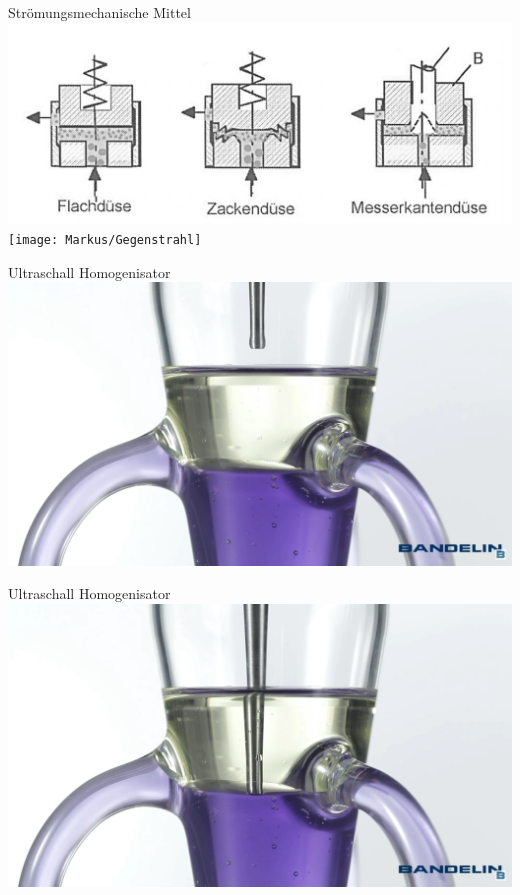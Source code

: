 \documentclass{beamer} %
\begin{document}
\begin{frame}{Strömungsmechanische Mittel}
	\centering
	\includegraphics[width=0.9\linewidth]{Markus/Radialdiffusoren}\\
	\texttt{[image: Markus/Gegenstrahl]}
\end{frame}

\begin{frame}{Ultraschall Homogenisator}
	\centering
	\includegraphics[width=\linewidth]{Markus/uh1}
\end{frame}
\begin{frame}{Ultraschall Homogenisator}
	\centering
	\includegraphics[width=\linewidth]{Markus/uh2}
\end{frame}
\end{document}

